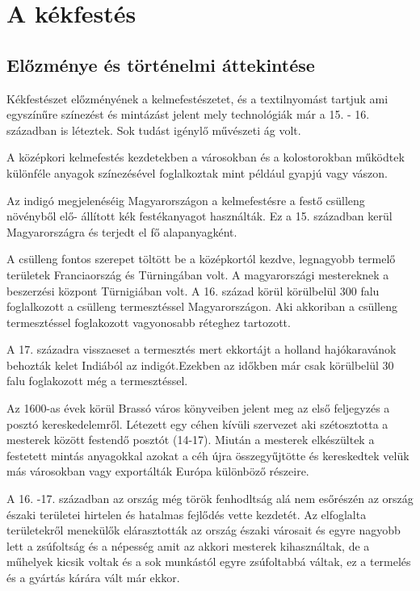 \chapter{A kékfestés}
\section{Előzménye és történelmi áttekintése}
Kékfestészet előzményének a kelmefestészetet, és a textilnyomást tartjuk ami egyszínűre színezést és mintázást jelent mely technológiák már a 15. - 16. században is léteztek. Sok tudást igénylő művészeti ág volt.

A középkori kelmefestés kezdetekben a városokban és a kolostorokban működtek különféle anyagok színezésével foglalkoztak mint például gyapjú vagy vászon. 

Az indigó megjelenéséig Magyarországon a kelmefestésre a festő csülleng növényből elő- állított kék festékanyagot használták. Ez a 15. században  kerül Magyarországra és terjedt el fő alapanyagként.

A csülleng fontos szerepet töltött be a középkortól kezdve, legnagyobb termelő területek Franciaország és Türningában volt. A magyarországi mestereknek a beszerzési központ Türnigiában volt.
A 16. század körül körülbelül 300 falu foglalkozott a csülleng termesztéssel Magyarországon. Aki akkoriban a csülleng termesztéssel foglakozott vagyonosabb réteghez tartozott. 

A 17. századra visszaeset  a termesztés mert ekkortájt a holland hajókaravánok behozták kelet Indiából az indigót.Ezekben az időkben már csak körülbelül 30 falu foglakozott még a termesztéssel.

Az 1600-as évek körül Brassó város könyveiben jelent meg az első feljegyzés a posztó kereskedelemről.
Létezett egy céhen kívüli szervezet aki szétosztotta  a mesterek között festendő posztót \cite{domonkos1981magyarorszagi}(14-17).
Miután a mesterek elkészültek a festetett mintás anyagokkal azokat a céh újra összegyűjtötte és kereskedtek  velük más városokban vagy exportálták Európa különböző részeire.

A 16. -17. században az ország még török fenhodltság alá nem esőrészén az ország északi területei hirtelen és hatalmas fejlődés vette kezdetét.
Az elfoglalta területekről menekülők elárasztották az ország északi városait és egyre nagyobb lett a zsúfoltság és a népesség amit az akkori mesterek kihasználtak, de a műhelyek kicsik voltak és a sok munkástól egyre zsúfoltabbá váltak, ez a termelés és a gyártás kárára vált már ekkor.

